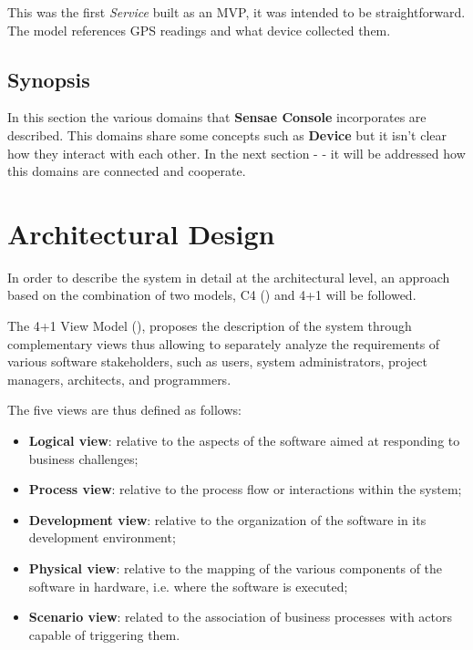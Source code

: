 This was the first \textit{Service} built as an \gls{MVP}, it was intended to be straightforward. The model references \gls{GPS} readings and what device collected them.

\subsection{Synopsis}
\label{subsec:design:domain:synopsis}

In this section the various domains that \textbf{Sensae Console} incorporates are described. This domains share some concepts such as \textbf{Device} but it isn't clear how they interact with each other. In the next section -  - it will be addressed how this domains are connected and cooperate.   

\section{Architectural Design}
\label{sec:design:architecture}

In order to describe the system in detail at the architectural level, an approach based on the combination of two models, C4 (\cite{c4model-site}) and 4+1  will be followed.

The 4+1 View Model (\cite{4plus1model}), proposes the description of the system through complementary views thus allowing to separately analyze the requirements of various software stakeholders, such as users, system administrators, project managers, architects, and programmers.

The five views are thus defined as follows:
\begin{itemize}
   \item \textbf{Logical view}: relative to the aspects of the software aimed at responding to business challenges;
   \item \textbf{Process view}: relative to the process flow or interactions within the system;
   \item \textbf{Development view}: relative to the organization of the software in its development environment;
   \item \textbf{Physical view}: relative to the mapping of the various components of the software in hardware, i.e. where the software is executed;
   \item \textbf{Scenario view}: related to the association of business processes with actors capable of triggering them.
\end{itemize}

